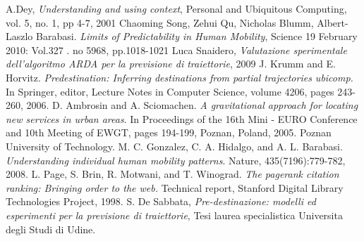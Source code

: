 \begin{thebibliography}{999}
 A.Dey, \textit{Understanding and using context}, Personal and Ubiquitous Computing, vol. 5, no. 1, pp 4-7, 2001
 Chaoming Song, Zehui Qu, Nicholas Blumm, Albert-Laszlo Barabasi. \textit{Limits of Predictability in Human Mobility}, Science 19 February 2010: Vol.327 . no 5968, pp.1018-1021
 Luca Snaidero, \textit{Valutazione sperimentale dell'algoritmo ARDA per la previsione di traiettorie}, 2009
 J. Krumm and E. Horvitz. \textit{Predestination: Inferring destinations from partial trajectories ubicomp.} In Springer, editor, Lecture Notes in Computer Science, volume 4206, pages 243-260, 2006.
 D. Ambrosin and A. Sciomachen. \textit{A gravitational approach for locating new services in urban areas}. In Proceedings of the 16th Mini - EURO Conference and 10th Meeting of EWGT, pages 194-199, Poznan, Poland, 2005. Poznan University of Technology.
 M. C. Gonzalez, C. A. Hidalgo, and A. L. Barabasi. \textit{Understanding individual human mobility patterns}. Nature, 435(7196):779-782, 2008.
 L. Page, S. Brin, R. Motwani, and T. Winograd. \textit{The pagerank citation ranking: Bringing order to the web.} Technical report, Stanford Digital Library Technologies Project, 1998.
 S. De Sabbata, \textit{Pre-destinazione: modelli ed esperimenti per la previsione di traiettorie}, Tesi laurea specialistica Universita degli Studi di Udine.
\end{thebibliography}
